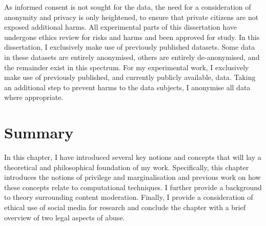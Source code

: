 As informed consent is not sought for the data, the need for a consideration of anonymity and privacy is only heightened, to ensure that private citizens are not exposed additional harms.
All experimental parts of this dissertation have undergone ethics review for risks and harms and been approved for study.
In this dissertation, I exclusively make use of previously published datasets. Some data in these datasets are entirely anonymised, others are entirely de-anonymised, and the remainder exist in this spectrum.
For my experimental work, I exclusively make use of previously published, and currently publicly available, data.
Taking an additional step to prevent harms to the data subjects, I anonymise all data where appropriate.


\section{Summary}
In this chapter, I have introduced several key notions and concepts that will lay a theoretical and philosophical foundation of my work.
Specifically, this chapter introduces the notions of privilege and marginalisation and previous work on how these concepts relate to computational techniques. I further provide a background to theory surrounding content moderation. Finally, I provide a consideration of ethical use of social media for research and conclude the chapter with a brief overview of two legal aspects of abuse.
